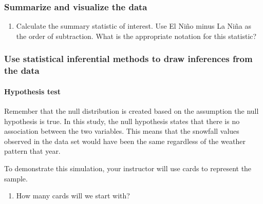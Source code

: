 \documentclass[
]{report}
\providecommand{\tightlist}{%
  \setlength{\itemsep}{0pt}\setlength{\parskip}{0pt}}
\newcommand\latexcode[1]{#1}
\begin{document}
\vspace{1in}

\hypertarget{summarize-and-visualize-the-data-3}{%
\subsubsection*{Summarize and visualize the data}\label{summarize-and-visualize-the-data-3}}

\begin{enumerate}
\def\labelenumi{\arabic{enumi}.}
\setcounter{enumi}{8}
\tightlist
\item
  Calculate the summary statistic of interest. Use El Ni\latexcode{\~{n}}o minus La Ni\latexcode{\~{n}}a as the order of subtraction. What is the appropriate notation for this statistic?
\end{enumerate}

\vspace{0.5in}

\newpage

\hypertarget{use-statistical-inferential-methods-to-draw-inferences-from-the-data-1}{%
\subsubsection*{Use statistical inferential methods to draw inferences from the data}\label{use-statistical-inferential-methods-to-draw-inferences-from-the-data-1}}

\hypertarget{hypothesis-test-1}{%
\paragraph*{Hypothesis test}\label{hypothesis-test-1}}

Remember that the null distribution is created based on the assumption the null hypothesis is true. In this study, the null hypothesis states that there is no association between the two variables. This means that the snowfall values observed in the data set would have been the same regardless of the weather pattern that year.

To demonstrate this simulation, your instructor will use cards to represent the sample.

\begin{enumerate}
\def\labelenumi{\arabic{enumi}.}
\setcounter{enumi}{9}
\tightlist
\item
  How many cards will we start with?
\end{enumerate}
\end{document}
